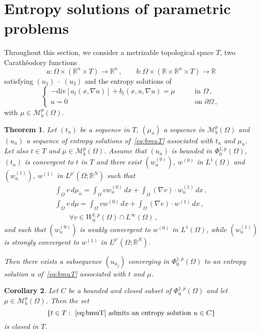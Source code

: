 \documentclass[twoside,reqno]{amsart}
\numberwithin{equation}{section}
\newtheorem{thm}{Theorem}[section]
\newtheorem{cor}[thm]{Corollary}
\theoremstyle{definition}
\newcommand{\R}{\mathbb{R}}
\begin{document}
\section{Entropy solutions of parametric problems}
\label{sect:parametric}
%
Throughout this section, we consider a metrizable topological 
space $T$, two Carath\'eodory functions
\[
a:\Omega\times
\left(\R^n\times T\right)\rightarrow \R^n\,,\qquad
b:\Omega\times
\left(\R\times\R^n\times T\right)\rightarrow \R
\]
satisfying $(u_1)$ -- $(u_3)$ and the entropy solutions of
\begin{equation}
\label{eq:bmuT}
\begin{cases}
- \mathrm{div}[a_t(x,\nabla u)] + b_t(x,u,\nabla u)=\mu 
&\qquad\text{in $\Omega$}\,,\\
u=0
&\qquad\text{on $\partial\Omega$}\,,
\end{cases}
\end{equation}
with $\mu\in\mathcal{M}_b^p(\Omega)$.
%
\begin{thm}
\label{thm:proper}
Let $(t_n)$ be a sequence in $T$, $(\mu_n)$ a sequence in 
$\mathcal{M}_b^p(\Omega)$ and $(u_n)$ a sequence of entropy 
solutions of~\eqref{eq:bmuT} associated with $t_n$ and $\mu_n$.
Let also $t\in T$ and $\mu\in\mathcal{M}_b^p(\Omega)$.
Assume that $(u_n)$ is bounded in $\Phi^{1,p}_0(\Omega)$, 
$(t_n)$ is convergent to $t$ in $T$ and there exist $(w_n^{(0)})$, 
$w^{(0)}$ in $L^1(\Omega)$ and $(w_n^{(1)})$, $w^{(1)}$ in 
$L^{p'}(\Omega;\R^N)$ such that
\begin{multline*}
\int_\Omega v\,d\mu_n 
= \int_\Omega v w_n^{(0)}\,dx 
+\int_\Omega (\nabla v)\cdot w_n^{(1)}\,dx\,,\\ 
\int_\Omega v\,d\mu 
= \int_\Omega v w^{(0)}\,dx 
+\int_\Omega (\nabla v)\cdot w^{(1)}\,dx\,,\\ 
\qquad\forall v\in W^{1,p}_0(\Omega)\cap L^\infty(\Omega)\,,
\end{multline*}
and such that $(w_n^{(0)})$ is weakly convergent to
$w^{(0)}$ in $L^1(\Omega)$, while $(w_n^{(1)})$ is strongly
convergent to $w^{(1)}$ in $L^{p'}(\Omega;\R^N)$.
\par
Then there exists a subsequence $(u_{n_j})$ converging in 
$\Phi^{1,p}_0(\Omega)$ to an entropy solution $u$
of~\eqref{eq:bmuT} associated with $t$ and $\mu$.
\end{thm}
%
\begin{cor}
\label{cor:closed}
Let $C$ be a bounded and closed subset of $\Phi^{1,p}_0(\Omega)$
and let $\mu\in\mathcal{M}_b^p(\Omega)$.
Then the set
\[
\left\{t\in T:\,\,
\text{\eqref{eq:bmuT} admits an entropy solution $u\in C$}\right\}
\]
is closed in $T$.
\end{cor}
\end{document}
